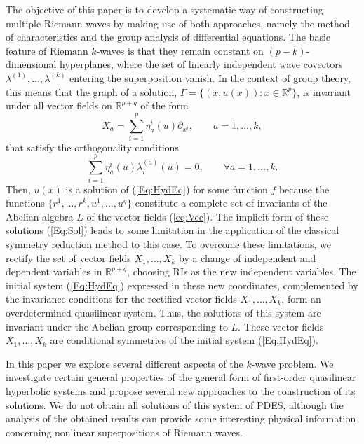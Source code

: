 \documentclass{birkjour}
\theoremstyle{definition}
\theoremstyle{remark}
\numberwithin{equation}{section}
\numberwithin{equation}{section}
\numberwithin{thm}{section}
\numberwithin{equation}{section}
\numberwithin{thm}{section}
\begin{document}
The objective of this paper is to develop a systematic way of constructing multiple Riemann waves by making use of both approaches, namely the method of characteristics and the group analysis of differential equations. The basic feature of Riemann $k$-waves is that they remain constant on $(p-k)$- dimensional hyperplanes, where the set of linearly independent wave covectors $\lambda^{(1)},\ldots,\lambda^{(k)}$ entering the superposition vanish. In the context of group theory, this means that the graph  of a solution, $\Gamma=\{(x,u(x)):x\in \mathbb{R}^p\}$, is invariant under all vector fields on $\mathbb{R}^{p+q}$ of the form
\begin{equation}
	\label{eq:Vec}
	X_a=\sum_{i=1}^p\eta^i_a(u)\partial_{x^i},\qquad a=1,\ldots,k,
\end{equation}
that satisfy the orthogonality conditions
$$
\sum_{i=1}^p\eta^i_a(u)\lambda^{(a)}_i(u)=0,\qquad \forall a=1,\ldots,k.
$$
Then, $u(x)$ is a solution of (\ref{Eq:HydEq}) for some function $f$ because the functions $\{r^1,\ldots,r^k,u^1,\ldots,u^q\}$ constitute a complete set of invariants of the Abelian algebra $L$ of the vector fields (\ref{eq:Vec}). The implicit form of these solutions (\ref{Eq:Sol}) leads to some limitation in the application of the classical symmetry reduction method to this case. To overcome these limitations, we rectify the set of vector fields $X_1,\ldots,X_k$ by a change of independent and dependent  variables in $\mathbb{R}^{p+q}$, choosing RIs as the new independent variables. The initial system (\ref{Eq:HydEq}) expressed in these new coordinates, complemented by the invariance conditions for the rectified vector fields $X_1,\ldots,X_k$, form an overdetermined quasilinear system. Thus, the solutions of this system are invariant under the Abelian group corresponding to $L$. These vector fields $X_1,\ldots,X_k$ are conditional symmetries of the initial system (\ref{Eq:HydEq}).


In this paper we explore several different aspects of the $k$-wave problem. We investigate certain general properties of the general form of first-order quasilinear hyperbolic systems and propose several new approaches to the construction of its solutions. We do not obtain all solutions of this system of PDES, although the analysis of the obtained results can provide some interesting physical information concerning nonlinear superpositions of Riemann waves. 
\end{document}
